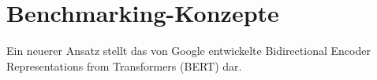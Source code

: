 \section{Benchmarking-Konzepte}
Ein neuerer Ansatz stellt das von Google entwickelte Bidirectional Encoder Representations from Transformers (BERT) dar.
